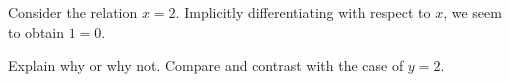 \documentclass{ximera}
\author{Steven Gubkin}
\begin{document}
\begin{exercise}

Consider the relation $x = 2$.  Implicitly differentiating with
respect to $x$, we seem to obtain $1 = 0$.
\begin{multipleChoice}
\end{multipleChoice}
Explain why or why not.  Compare and contrast with the case of  $y=2$.
\end{exercise}
\end{document}
